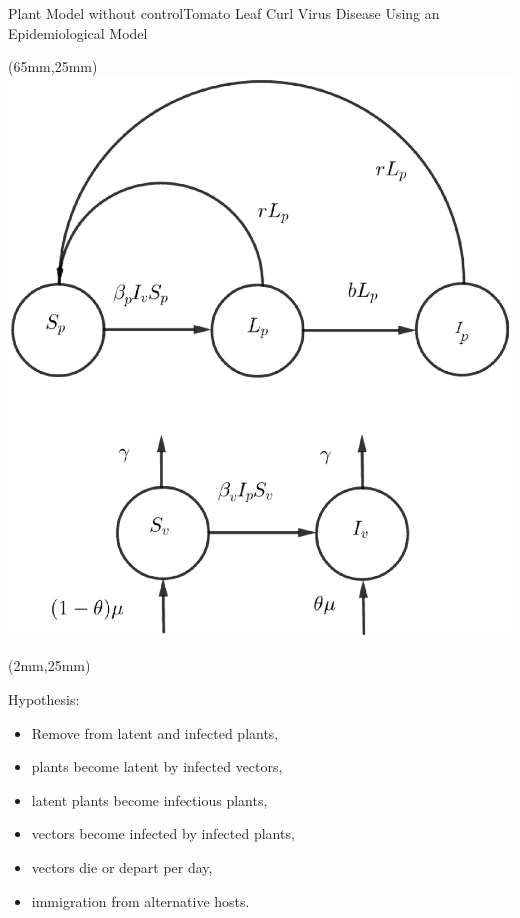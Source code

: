 
\begin{frame}{}
	\begin{bibunit}[abbrv]
		\nocite{Holt1999b}
		\putbib
	\end{bibunit}
\end{frame}

\begin{frame}{Plant Model without control}{Tomato Leaf Curl Virus Disease Using an Epidemiological Model}
		\begin{textblock*}{60mm}(65mm,25mm)
			\includegraphics[width=\linewidth]{Feathergraphics/plant_diagram.eps}
		\end{textblock*}
		\begin{textblock*}{60mm}(2mm,25mm)
			\begin{graybox}{Hypothesis:}
				
				\begin{itemize}
					\item<1-> Remove from latent and infected plants,
					\item<2-> plants become latent by infected vectors,
					\item<3-> latent plants become infectious plants,
					\item<4-> vectors become infected by infected plants,
					\item<5-> vectors die or depart per day,
					\item<6-> immigration from alternative hosts.
				\end{itemize}
			\end{graybox}	
		\end{textblock*}
\end{frame}

